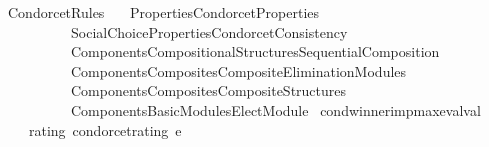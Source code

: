 %
\begin{isabellebody}%
%
%
\isadelimtheory
%
\endisadelimtheory
%
\isatagtheory
{}\isamarkupfalse%
\ Condorcet{\isacharunderscore}{\kern0pt}Rules\isanewline
\ \ \ {\isachardoublequoteopen}{\isachardot}{\kern0pt}{\isachardot}{\kern0pt}{\isacharslash}{\kern0pt}Properties{\isacharslash}{\kern0pt}Condorcet{\isacharunderscore}{\kern0pt}Properties{\isachardoublequoteclose}\isanewline
\ \ \ \ \ \ \ \ \ \ {\isachardoublequoteopen}{\isachardot}{\kern0pt}{\isachardot}{\kern0pt}{\isacharslash}{\kern0pt}{\isachardot}{\kern0pt}{\isachardot}{\kern0pt}{\isacharslash}{\kern0pt}Social{\isacharunderscore}{\kern0pt}Choice{\isacharunderscore}{\kern0pt}Properties{\isacharslash}{\kern0pt}Condorcet{\isacharunderscore}{\kern0pt}Consistency{\isachardoublequoteclose}\isanewline
\ \ \ \ \ \ \ \ \ \ {\isachardoublequoteopen}{\isachardot}{\kern0pt}{\isachardot}{\kern0pt}{\isacharslash}{\kern0pt}Components{\isacharslash}{\kern0pt}Compositional{\isacharunderscore}{\kern0pt}Structures{\isacharslash}{\kern0pt}Sequential{\isacharunderscore}{\kern0pt}Composition{\isachardoublequoteclose}\isanewline
\ \ \ \ \ \ \ \ \ \ {\isachardoublequoteopen}{\isachardot}{\kern0pt}{\isachardot}{\kern0pt}{\isacharslash}{\kern0pt}Components{\isacharslash}{\kern0pt}Composites{\isacharslash}{\kern0pt}Composite{\isacharunderscore}{\kern0pt}Elimination{\isacharunderscore}{\kern0pt}Modules{\isachardoublequoteclose}\isanewline
\ \ \ \ \ \ \ \ \ \ {\isachardoublequoteopen}{\isachardot}{\kern0pt}{\isachardot}{\kern0pt}{\isacharslash}{\kern0pt}Components{\isacharslash}{\kern0pt}Composites{\isacharslash}{\kern0pt}Composite{\isacharunderscore}{\kern0pt}Structures{\isachardoublequoteclose}\isanewline
\ \ \ \ \ \ \ \ \ \ {\isachardoublequoteopen}{\isachardot}{\kern0pt}{\isachardot}{\kern0pt}{\isacharslash}{\kern0pt}Components{\isacharslash}{\kern0pt}Basic{\isacharunderscore}{\kern0pt}Modules{\isacharslash}{\kern0pt}Elect{\isacharunderscore}{\kern0pt}Module{\isachardoublequoteclose}\isanewline
{}%
\endisatagtheory
{\isafoldtheory}%
%
\isadelimtheory
\isanewline
%
\endisadelimtheory
\isanewline
\isanewline
{}\isamarkupfalse%
\ cond{\isacharunderscore}{\kern0pt}winner{\isacharunderscore}{\kern0pt}imp{\isacharunderscore}{\kern0pt}max{\isacharunderscore}{\kern0pt}eval{\isacharunderscore}{\kern0pt}val{\isacharcolon}{\kern0pt}\isanewline
\ \ \isanewline
\ \ \ \ rating{\isacharcolon}{\kern0pt}\ {\isachardoublequoteopen}condorcet{\isacharunderscore}{\kern0pt}rating\ e{\isachardoublequoteclose}\ \isanewline

\end{isabellebody}
